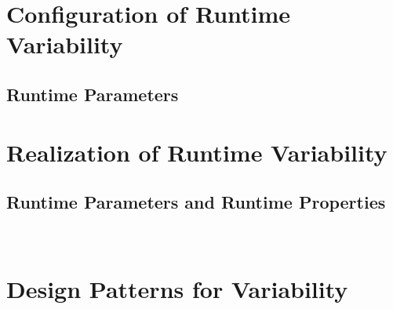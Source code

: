 \documentclass[
	aspectratio=169, %
	8pt, %
	handout, %
]{beamer}
\subtitle{2. Runtime Variability and Design Patterns}
\author{Timo Kehrer}
\begin{document}



\section{Configuration of Runtime Variability}

\subsection{Runtime Parameters}
\begin{frame}{\insertsubsection}
\end{frame}

\lessonslearned{
	\item \ldots
}{
	\item \ldots
}{
	\ldots
}

\sectionend

\section{Realization of Runtime Variability}

\subsection{Runtime Parameters and Runtime Properties}
\begin{frame}{\insertsubsection\ \mytitlesource{\featureide}}
\end{frame}

\lessonslearned{
	\item \ldots
}{
	\item \ldots
}{
	\ldots
}

\sectionend

\section{Design Patterns for Variability}



\lessonslearned{
	\item \ldots
}{
	\item \ldots
}{
	\ldots
}


\end{document}

